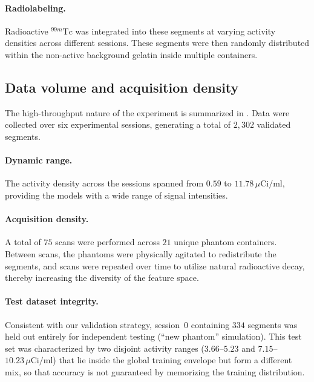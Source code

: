 \paragraph{Radiolabeling.}
Radioactive $^{99m}\mathrm{Tc}$ was integrated into these segments at varying activity densities across different sessions.
These segments were then randomly distributed within the non-active background gelatin inside multiple containers.

\subsection{Data volume and acquisition density}

The high-throughput nature of the experiment is summarized in .
Data were collected over six experimental sessions, generating a total of $2{,}302$ validated segments.

\paragraph{Dynamic range.}
The activity density across the sessions spanned from $0.59$ to $11.78\,\mu\mathrm{Ci/ml}$, providing the models with a wide range of signal intensities.

\paragraph{Acquisition density.}
A total of $75$ scans were performed across $21$ unique phantom containers.
Between scans, the phantoms were physically agitated to redistribute the segments, and scans were repeated over time to utilize natural radioactive decay, thereby increasing the diversity of the feature space.

\paragraph{Test dataset integrity.}
Consistent with our validation strategy, session~$0$ containing $334$ segments was held out entirely for independent testing (``new phantom'' simulation).
This test set was characterized by two disjoint activity ranges ($3.66$--$5.23$ and $7.15$--$10.23\,\mu\mathrm{Ci/ml}$) that lie inside the global training envelope but form a different mix, so that accuracy is not guaranteed by memorizing the training distribution.

